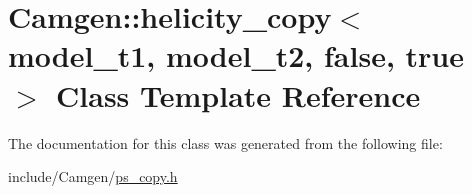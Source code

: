 \hypertarget{a00264}{\section{Camgen\-:\-:helicity\-\_\-copy$<$ model\-\_\-t1, model\-\_\-t2, false, true $>$ Class Template Reference}
\label{a00264}
}


The documentation for this class was generated from the following file\-:\begin{DoxyCompactItemize}
\item 
include/\-Camgen/\hyperlink{a00712}{ps\-\_\-copy.\-h}\end{DoxyCompactItemize}
